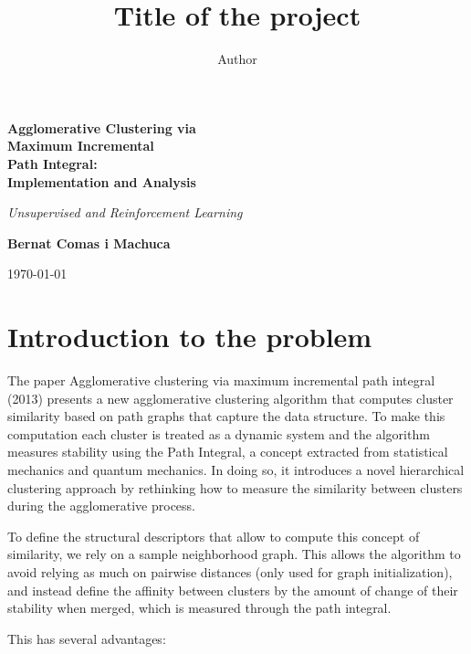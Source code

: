 \documentclass[
	10pt,
	parskip=half-,	
	paper=a4,
	english
	]{scrartcl}
\title{Title of the project}
\author{Author}
\date{\newdateformat{monthyeardate}{%
  \monthname[\THEMONTH], \THEYEAR}}
\date{}
\begin{document}
\begin{titlepage}
    \centering
    \vspace*{3cm}

    {\Huge\bfseries Agglomerative Clustering via\\[0.1cm]
    Maximum Incremental\\[0.1cm] 
    Path Integral:\\[0.1cm]
    Implementation and Analysis\par}
    \vspace{1.5cm}

    {\Large\itshape Unsupervised and Reinforcement Learning\par}
    \vspace{1.5cm}

    {\Large\textbf{Bernat Comas i Machuca}\par}
    \vspace{1cm}

    {\large\today\par}
    \vspace*{\fill}

\end{titlepage}

\newpage			
\tableofcontents
\newpage
\section {Introduction to the problem}

The paper Agglomerative clustering via maximum incremental path integral (2013) \cite{citation1} presents a new agglomerative clustering algorithm that computes cluster similarity based on path graphs that capture the data structure. To make this computation each cluster is treated as a dynamic system and the algorithm measures stability using the Path Integral, a concept extracted from statistical mechanics and quantum mechanics. In doing so, it introduces a novel hierarchical clustering approach by rethinking how to measure the similarity between clusters during the agglomerative process.

To define the structural descriptors that allow to compute this concept of similarity, we rely on a sample neighborhood graph. This allows the algorithm to avoid relying as much on pairwise distances (only used for graph initialization), and instead define the affinity between clusters by the amount of change of their stability when merged, which is measured through the path integral.

This has several advantages:
\end{document}

